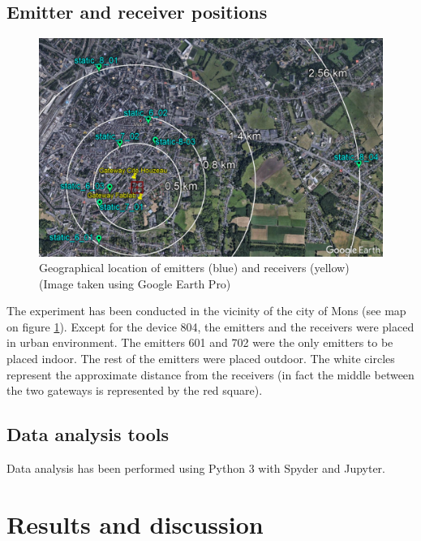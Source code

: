\documentclass[letterpaper, 10 pt, conference]{ieeeconf}  %
\begin{document}
\subsection{Emitter and receiver positions}

\begin{figure}[ht!]
\centering
\includegraphics[scale=0.22]{location_map.JPG}
\caption{Geographical location of emitters (blue) and receivers (yellow) (Image taken using Google Earth Pro)}
\label{location_map}
\end{figure}

The experiment has been conducted in the vicinity of the city of Mons (see map on figure \ref{location_map}). Except for the device 8\textunderscore{}04, the emitters and the receivers were placed in urban environment. The emitters 6\textunderscore{}01 and 7\textunderscore{}02 were the only emitters to be placed indoor. The rest of the emitters were placed outdoor. The white circles represent the approximate distance from the receivers (in fact the middle between the two gateways is represented by the red square).


\subsection{Data analysis tools}

Data analysis has been performed using Python 3 with Spyder and Jupyter.

\section{Results and discussion}
\end{document}
